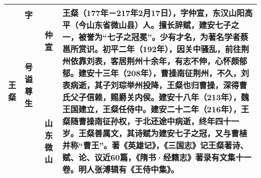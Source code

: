 \begin{longtable}{|>{\centering\namefont\heiti}m{2em}|>{\centering\tiny}m{3.0em}|>{\xzfont\kaiti}m{7em}|}
    王粲 & \begin{description}
    \item[字] 仲宣
    \item[号] 
    \item[谥] 
    \item[尊] 
    \item[生] 山东微山
    \end{description} & 王粲（177年－217年2月17日），字仲宣，东汉山阳高平（今山东省微山县）人。擅长辞赋，建安七子之一，被誉为“七子之冠冕”。少有才名，为著名学者蔡邕所赏识。初平二年（192年），因关中骚乱，前往荆州依靠刘表，客居荆州十余年，有志不伸，心怀颇郁郁。建安十三年（208年），曹操南征荆州，不久，刘表病逝，其子刘琮举州投降，王粲也归曹操，深得曹氏父子信赖，赐爵关内侯。建安十八年（213年），魏王国建立，王粲任侍中。建安二十二年（216年），王粲随曹操南征孙权，于北还途中病逝，终年四十一岁。王粲善属文，其诗赋为建安七子之冠，又与曹植并称“曹王”。著《英雄记》，《三国志》记王粲著诗、赋、论、议近60篇，《隋书·经籍志》著录有文集十一卷。明人张溥辑有《王侍中集》。 \tabularnewline\hline

    \bottomrule
\end{longtable}


